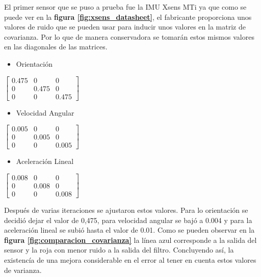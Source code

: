El primer sensor que se puso a prueba fue la IMU Xsens MTi ya que como se puede ver en la \textbf{figura \ref{fig:xsens_datasheet}}, el fabricante 
proporciona unos valores de ruido que se pueden usar para inducir unos valores en la matriz de covarianza. Por lo que de manera conservadora se tomarán 
estos mismos valores en las diagonales de las matrices.

\begin{minipage}[b]{0.3\textwidth}
    \centering

\begin{itemize}
  \item Orientación
\end{itemize}
$\begin{bmatrix}
  0.475 & 0 & 0\\
  0 & 0.475 & 0\\
  0 & 0 & 0.475
\end{bmatrix}$
\end{minipage}
\hfill
\begin{minipage}[b]{0.3\textwidth}
    \centering

\begin{itemize}
  \item Velocidad Angular
\end{itemize}
$\begin{bmatrix}
  0.005 & 0 & 0\\
  0 & 0.005 & 0\\
  0 & 0 & 0.005
\end{bmatrix}$
\end{minipage}
\hfill
\begin{minipage}[b]{0.3\textwidth}
    \centering


\begin{itemize}
  \item Aceleración Lineal
\end{itemize}

$\begin{bmatrix}
  0.008 & 0 & 0\\
  0 & 0.008 & 0\\
  0 & 0 & 0.008
\end{bmatrix}$

\end{minipage}


Después de varias iteraciones se ajustaron estos valores. Para lo orientación se decidió dejar el valor de 0,475, para velocidad angular se bajó a 0.004 y para la aceleración lineal se subió hasta 
el valor de 0.01. Como se pueden observar en la \textbf{figura \ref{fig:comparacion_covarianza}} la línea azul corresponde a la salida del sensor y 
la roja con menor ruido a la salida del filtro. Concluyendo así, la existencía de una mejora considerable en el error al tener en cuenta estos valores de varianza.



